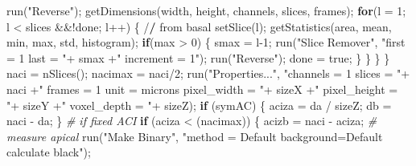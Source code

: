\documentclass[10pt, b5paper, singlespacinge, twoside]{reedthesis} %
\newenvironment{Shaded}{}{}
\newcommand{\AttributeTok}[1]{#1}
\newcommand{\CommentTok}[1]{\textit{#1}}
\newcommand{\ControlFlowTok}[1]{\textbf{#1}}
\newcommand{\DecValTok}[1]{#1}
\newcommand{\ErrorTok}[1]{\textbf{#1}}
\newcommand{\FunctionTok}[1]{#1}
\newcommand{\NormalTok}[1]{#1}
\newcommand{\OtherTok}[1]{#1}
\newcommand{\SpecialCharTok}[1]{#1}
\newcommand{\StringTok}[1]{#1}
\theoremstyle{definition}
\theoremstyle{definition}
\theoremstyle{definition}
\theoremstyle{remark}
\begin{document}
\begin{Shaded}
\begin{Highlighting}[numbers=left,,]
            \FunctionTok{run}\NormalTok{(}\StringTok{"Reverse"}\NormalTok{);}
            \FunctionTok{getDimensions}\NormalTok{(width, height, channels, slices, frames);}
            \ControlFlowTok{for}\NormalTok{(}\AttributeTok{l =} \DecValTok{1}\NormalTok{; l }\SpecialCharTok{\textless{}}\NormalTok{ slices }\SpecialCharTok{\&\&!}\NormalTok{done; l}\SpecialCharTok{++}\NormalTok{) \{ }\SpecialCharTok{/}\ErrorTok{/}\NormalTok{ from basal}
                  \FunctionTok{setSlice}\NormalTok{(l);}
                    \FunctionTok{getStatistics}\NormalTok{(area, mean, min, max, std, histogram);}
                    \ControlFlowTok{if}\NormalTok{(max }\SpecialCharTok{\textgreater{}} \DecValTok{0}\NormalTok{) \{}
\NormalTok{                      smax }\OtherTok{=}\NormalTok{ l}\DecValTok{{-}1}\NormalTok{;}
                        \FunctionTok{run}\NormalTok{(}\StringTok{"Slice Remover"}\NormalTok{, }\StringTok{"first = 1 last = "}\SpecialCharTok{+}\NormalTok{ smax }\SpecialCharTok{+}\StringTok{" increment = 1"}\NormalTok{);}
                        \FunctionTok{run}\NormalTok{(}\StringTok{"Reverse"}\NormalTok{);}
\NormalTok{                        done }\OtherTok{=}\NormalTok{ true;}
\NormalTok{                    \}}
\NormalTok{                \}}
\NormalTok{            \}}
\NormalTok{        \}}
\NormalTok{        naci }\OtherTok{=} \FunctionTok{nSlices}\NormalTok{();}
\NormalTok{        nacimax }\OtherTok{=}\NormalTok{ naci}\SpecialCharTok{/}\DecValTok{2}\NormalTok{;}
        \FunctionTok{run}\NormalTok{(}\StringTok{"Properties..."}\NormalTok{, }\StringTok{"channels = 1 slices = "}\SpecialCharTok{+}\NormalTok{ naci }\SpecialCharTok{+}\StringTok{" frames = 1 unit = microns }
\StringTok{            pixel\_width = "}\SpecialCharTok{+}\NormalTok{ sizeX }\SpecialCharTok{+}\StringTok{" pixel\_height = "}\SpecialCharTok{+}\NormalTok{ sizeY }\SpecialCharTok{+}\StringTok{" voxel\_depth = "}\SpecialCharTok{+}\NormalTok{ sizeZ);}
        \ControlFlowTok{if}\NormalTok{ (symAC) \{}
\NormalTok{            aciza }\OtherTok{=}\NormalTok{ da }\SpecialCharTok{/}\NormalTok{ sizeZ;}
\NormalTok{            db }\OtherTok{=}\NormalTok{ naci }\SpecialCharTok{{-}}\NormalTok{ da;}
\NormalTok{        \}}
    \CommentTok{\# if fixed ACI}
        \ControlFlowTok{if}\NormalTok{ (aciza }\SpecialCharTok{\textless{}}\NormalTok{ (nacimax)) \{}
\NormalTok{          acizb }\OtherTok{=}\NormalTok{ naci }\SpecialCharTok{{-}}\NormalTok{ aciza;}
    \CommentTok{\# measure apical}
        \FunctionTok{run}\NormalTok{(}\StringTok{"Make Binary"}\NormalTok{, }\StringTok{"method = Default background=Default calculate black"}\NormalTok{);}

\end{Highlighting}
\end{Shaded}
\end{document}
